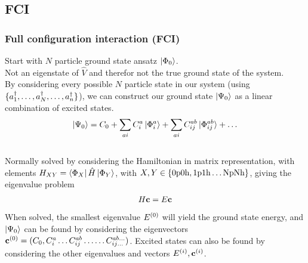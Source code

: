 \documentclass[
11pt,notheorems,hyperref={pdfauthor=whatever}
]{beamer}
\begin{document}
\subsection{FCI}
\begin{frame}
    \frametitle{Full configuration interaction (FCI)}

    Start with $N$ particle ground state ansatz $\ket{\Phi_0}$.
    \\[10pt]
    Not an eigenstate of $\hat{V}$ and therefor not the true ground state of the system.
    \\[10pt]
    By considering every possible $N$ particle state in our system (using $\{ a_{1}^{\dagger},\ldots,a_{N}^{\dagger},\ldots,a_{n}^{\dagger} \}$), we can construct our ground state $\ket{\Psi_0}$ as a linear combination of excited states.
    \begin{align*}
        \ket{\Psi_0} = C_0 + \sum_{ai} C_i^a \ket{\Phi_{i}^{a}} + \sum_{ai} C_{ij}^{ab} \ket{\Phi_{ij}^{ab}} + \ldots
    \end{align*} 
    \\[10pt] 
    Normally solved by considering the Hamiltonian in matrix representation, with elements $H_{XY} = \bra{\Phi_X}\hat{H}\ket{\Phi_Y}$, with $X, Y \in \{ \text{0p0h},\text{1p1h}\ldots\text{NpNh} \}$, giving the eigenvalue problem 
    \begin{align*}
        H \bold{c} = E\bold{c}
    \end{align*}
    When solved, the smallest eigenvalue $E^{(0)}$ will yield the ground state energy, and $\ket{\Psi_0}$ can be found by considering the eigenvectors $\bold{c}^{(0)} = (C_0, C_{i}^{a} \ldots C_{ij}^{ab} \ldots \ldots C_{ij\ldots}^{ab\ldots})$. Excited states can also be found by considering the other eigenvalues and vectors $E^{(i)}, \bold{c}^{(i)}$.
\end{frame}
\end{document}

